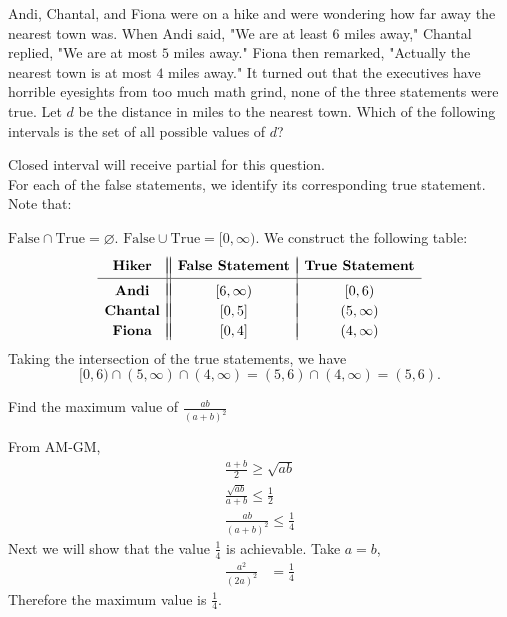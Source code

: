 \documentclass{article}
\begin{document}
\begin{custom-big}
Andi, Chantal, and Fiona were on a hike and were wondering how far away the nearest town was. When Andi said, "We are at least $6$ miles away," Chantal replied, "We are at most $5$ miles away." Fiona then remarked, "Actually the nearest town is at most $4$ miles away." It turned out that the executives have horrible eyesights from too much math grind, none of the three statements were true. Let $d$ be the distance in miles to the nearest town. Which of the following intervals is the set of all possible values of $d$?
\end{custom-big}

\begin{solution}

    Closed interval will receive partial for this question.\\

    For each of the false statements, we identify its corresponding true statement. Note that:

$\mathrm{False}\cap\mathrm{True}=\varnothing.$
$\mathrm{False}\cup\mathrm{True}=[0,\infty).$
We construct the following table:\[\begin{array}{c||c|c} & &  \\ [-2.5ex] \textbf{Hiker} & \textbf{False Statement} & \textbf{True Statement} \\ [0.5ex] \hline & & \\ [-2ex] \textbf{Andi} & [6,\infty) & [0,6) \\  & & \\ [-2.25ex] \textbf{Chantal} & [0,5] & (5,\infty)  \\ & & \\ [-2.25ex] \textbf{Fiona} & [0,4] & (4,\infty) \end{array}\]Taking the intersection of the true statements, we have\[[0,6)\cap(5,\infty)\cap(4,\infty)=(5,6)\cap(4,\infty)= (5,6).\]
\end{solution}

\begin{custom-big}
Find the maximum value of $\frac{ab}{(a+b)^2}$
\end{custom-big}

\begin{solution}
    From AM-GM, 
    \begin{align*}
        \frac{a+b}{2}\ge \sqrt{ab}\\
        \frac{\sqrt{ab}}{a+b}\leq \frac 12\\
        \frac{ab}{(a+b)^2}\leq \frac 14
    \end{align*}
    Next we will show that the value $\frac 14$ is achievable. Take $a=b$,
    \begin{align*}
        \frac{a^2}{(2a)^2}&=\frac 14
    \end{align*}
    Therefore the maximum value is $\frac 14$.
\end{solution}
\end{document}
